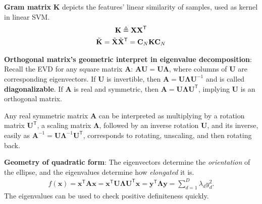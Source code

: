 \textbf{Gram matrix} $\mathbf{K}$ depicts the features' linear similarity of samples, used as kernel in linear SVM.
\begin{gather}
    \mathbf{K}\triangleq\mathbf{XX}^\mathsf{T}\\
    \Tilde{\mathbf{K}}=\Tilde{\mathbf{X}}\Tilde{\mathbf{X}}^\mathsf{T}=\mathbf{C}_N\mathbf{KC}_N
\end{gather}

\textbf{Orthogonal matrix's geometric interpret in eigenvalue decomposition}:
Recall the EVD for any square matrix $\mathbf{A}$: $\mathbf{AU}=\mathbf{U\Lambda}$,
where columns of $\mathbf{U}$ are corresponding eigenvectors.
If $\mathbf{U}$ is invertible, then $\mathbf{A}=\mathbf{U\Lambda U}^{-1}$ and is called \textbf{diagonalizable}.
If $\mathbf{A}$ is real and symmetric, then $\mathbf{A}=\mathbf{U\Lambda U}^\mathsf{T}$, 
implying $\mathbf{U}$ is an orthogonal matrix.

Any real symmetric matrix $\mathbf{A}$ can be interpreted as multiplying by 
a rotation matrix $\mathbf{U}^\mathsf{T}$, a scaling matrix $\mathbf{\Lambda}$, followed by an inverse rotation $\mathbf{U}$,
and its inverse, easily as $\mathbf{A}^{-1}=\mathbf{U\Lambda}^{-1}\mathbf{U}^\mathsf{T}$, 
corresponds to rotating, unscaling, and then rotating back.

\begin{example}
    \item \textbf{Geometry of quadratic form}: The eigenvectors determine
    the \textit{orientation} of the ellipse, and the eigenvalues determine how \textit{elongated} it is.
    \begin{gather}
        f(\bm{x})=\bm{x}^\mathsf{T}\mathbf{A}\bm{x}=\bm{x}^\mathsf{T}\mathbf{U\Lambda U}^\mathsf{T}\bm{x}
        =\bm{y}^\mathsf{T}\mathbf{\Lambda}\bm{y}=\sum_{d=1}^D \lambda_d y_d^2.
    \end{gather}
    The eigenvalues can be used to check positive definiteness quickly. 
\end{example}

